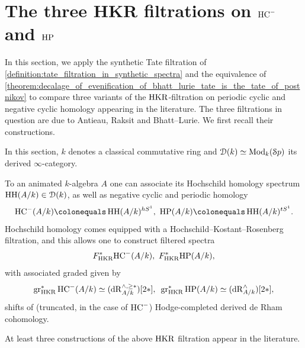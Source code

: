 \documentclass[oneside,a4paper]{amsart}
\begin{document}
\section{The three HKR filtrations on $\mathrm{HC}^{-}$ and $\mathrm{HP}$}\label{section:HKR_comparison}

In this section, we apply the synthetic Tate filtration of 
\cref{definition:tate_filtration_in_synthetic_spectra} and the equivalence of \cref{theorem:decalage_of_evenification_of_bhatt_lurie_tate_is_the_tate_of_postnikov} to compare three variants of the $\mathrm{HKR}$-filtration on periodic cyclic and negative cyclic homology appearing in the literature. The three filtrations in question are due to Antieau, Raksit and Bhatt--Lurie. We first recall their constructions. 

\begin{notation}
In this section, $k$ denotes a classical commutative ring and $\EuScript{D}(k) \simeq \mathrm{Mod}_{k}(\EuScript{S}p)$ its derived $\infty$-category. 
\end{notation}

\begin{recollection}
To an animated $k$-algebra $A$ one can associate its Hochschild homology spectrum $\operatorname{HH}(A / k) \in \EuScript{D}(k)$, as well as negative cyclic and periodic homology
\[
\HC^{-}(A / k) \colonequals \HH(A / k)^{hS^{1}}, \textnormal{ } \HP(A / k) \colonequals \HH(A / k)^{tS^{1}}. 
\]
Hochschild homology comes equipped with a Hochschild--Kostant--Rosenberg filtration, and this allows one to construct filtered spectra 
\[
F^{\ast}_{\mathrm{HKR}} \mathrm{HC}^{-}(A / k), \textnormal{ } F^{\ast}_{\mathrm{HKR}} \mathrm{HP}(A / k),
\]
with associated graded given by 
\[
\operatorname{gr}_{\mathrm{HKR}}^{\ast} \mathrm{HC}^{-}(A / k) \simeq (\mathrm{dR}_{A/k}^{\wedge, \geq \ast})[2 \ast], \textnormal{ } \operatorname{gr}_{\mathrm{HKR}}^{\ast} \mathrm{HP}(A / k) \simeq (\mathrm{dR}_{A/k}^{\wedge})[2 \ast], 
\]
shifts of (truncated, in the case of $\mathrm{HC}^{-}$) Hodge-completed derived de Rham cohomology. 
\end{recollection}

At least three constructions of the above $\mathrm{HKR}$ filtration appear in the literature.
\end{document}

